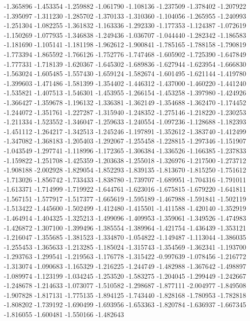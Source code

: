 -1.365896
-1.453354
-1.259882
-1.061790
-1.108136
-1.237509
-1.378402
-1.207922
-1.395097
-1.311230
-1.285702
-1.370133
-1.310360
-1.104056
-1.265955
-1.240993
-1.251304
-1.082255
-1.361832
-1.163336
-1.292330
-1.177353
-1.124387
-1.072619
-1.150269
-1.077935
-1.346838
-1.249436
-1.036707
-1.044440
-1.282342
-1.186583
-1.181690
-1.105141
-1.181198
-1.962612
-1.900841
-1.785165
-1.788158
-1.790819
-1.773394
-1.865592
-1.766126
-1.752776
-1.747468
-1.605902
-1.725390
-1.647849
-1.777331
-1.718139
-1.620367
-1.645302
-1.689836
-1.627944
-1.623954
-1.666830
-1.563024
-1.605485
-1.557430
-1.659124
-1.582674
-1.601495
-1.621144
-1.419780
-1.399603
-1.471486
-1.581399
-1.354402
-1.446312
-1.437000
-1.460220
-1.441240
-1.535821
-1.407513
-1.546301
-1.453955
-1.266154
-1.453258
-1.397980
-1.424926
-1.366427
-1.359678
-1.196132
-1.336381
-1.362149
-1.354688
-1.362470
-1.174452
-1.244072
-1.351761
-1.227287
-1.315940
-1.248352
-1.275146
-1.218220
-1.230253
-1.211334
-1.523552
-1.346047
-1.259633
-1.240554
-1.097236
-1.128688
-1.182393
-1.451112
-1.264217
-1.342513
-1.245246
-1.197891
-1.352612
-1.383740
-1.412499
-1.347082
-1.368183
-1.205403
-1.292067
-1.255458
-1.228815
-1.297346
-1.151907
-1.043549
-1.297741
-1.118996
-1.172365
-1.306384
-1.336526
-1.166385
-1.237833
-1.159822
-1.251708
-1.425359
-1.203638
-1.255018
-1.326976
-1.217500
-1.273712
-1.908188
-2.002928
-1.829054
-1.852293
-1.839135
-1.813670
-1.815250
-1.751612
-1.713026
-1.856742
-1.733433
-1.838780
-1.739707
-1.689951
-1.704316
-1.791011
-1.613371
-1.714999
-1.719922
-1.644761
-1.623016
-1.675815
-1.679220
-1.641811
-1.567151
-1.577917
-1.517377
-1.665619
-1.595189
-1.467988
-1.591841
-1.502119
-1.513422
-1.445600
-1.502499
-1.412480
-1.415501
-1.411588
-1.420140
-1.352919
-1.464914
-1.404325
-1.325213
-1.499096
-1.409953
-1.359061
-1.349526
-1.474983
-1.426872
-1.307100
-1.399496
-1.385554
-1.389964
-1.421754
-1.436439
-1.353121
-1.216047
-1.355685
-1.381523
-1.334870
-1.054822
-1.149487
-1.113044
-1.386035
-1.255453
-1.365633
-1.213285
-1.185024
-1.315743
-1.354569
-1.362341
-1.193700
-1.293763
-1.299541
-1.219563
-1.176778
-1.315422
-0.997639
-1.078456
-1.216772
-1.313074
-1.090683
-1.165329
-1.216225
-1.244749
-1.482988
-1.367642
-1.498897
-1.089974
-1.123199
-1.034245
-1.253520
-1.583275
-1.204045
-1.299449
-1.242667
-1.248678
-1.214633
-1.073077
-1.510582
-1.298687
-1.877111
-2.004977
-1.849508
-1.907828
-1.817131
-1.775135
-1.894125
-1.743440
-1.828168
-1.780953
-1.782818
-1.808202
-1.739192
-1.690499
-1.693956
-1.653363
-1.820784
-1.636937
-1.667345
-1.816055
-1.600481
-1.550166
-1.482643
